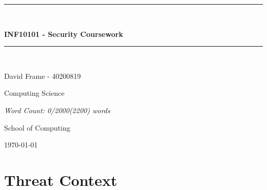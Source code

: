 \documentclass[12pt,a4paper]{article}
\begin{document}
%

\newcommand{\HRule}{\rule{\linewidth}{0.5mm}}

\begin{titlepage}
	\begin{center}

	\HRule \\[0.4cm]
    	{\Large \bfseries INF10101 - Security Coursework\par}
	\vspace{0.2cm}
	\HRule \\[1.5cm]

	
    	\vspace{1cm}
	\begin{minipage}{0.8\textwidth}
	\begin{center} \large
        David Frame - 40200819
        	
				
   	 \end{center}
    	\end{minipage}
	
    	\begin{minipage}{1\textwidth}
    	\begin{center} \large
        
		Computing Science
    	\end{center}
    	\end{minipage}
    	
    \vspace{2cm}
    \begin{minipage}{0.8\textwidth}
	\begin{center} \large
        \emph{Word Count: 0/2000(2200) words}
        	
				
   	 \end{center}
    	\end{minipage}
	
	

    	\vfill

	\begin{minipage}{1\textwidth}
    	\begin{center} \large
		School of Computing
    	\end{center}
    	\end{minipage}
	
	\vspace{1cm}
    	{\large \today}


	\end{center}
\end{titlepage}

\section{Threat Context}
\end{document}
